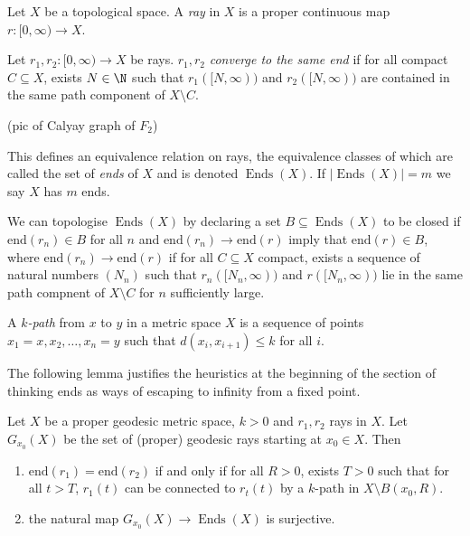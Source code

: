 \documentclass[a4paper]{article}
\DeclareMathOperator{\Ends}{Ends} %
\begin{document}
\begin{definition}[ray]
  Let \(X\) be a topological space. A \emph{ray} in \(X\) is a proper continuous map \(r: [0, \infty) \to X\).
\end{definition}

\begin{definition}
  Let \(r_1, r_2: [0, \infty) \to X\) be rays. \(r_1, r_2\) \emph{converge to the same end} if for all compact \(C \subseteq X\), exists \(N \in \N\) such that \(r_1([N, \infty))\) and \(r_2([N, \infty))\) are contained in the same path component of \(X \setminus C\).
\end{definition}

(pic of Calyay graph of \(F_2\))

This defines an equivalence relation on rays, the equivalence classes of which are called the set of \emph{ends} of \(X\) and is denoted \(\Ends(X)\). If \(|\Ends(X)| = m\) we say \(X\) has \(m\) ends.

We can topologise \(\Ends(X)\) by declaring a set \(B \subseteq \Ends(X)\) to be closed if \(\mathrm{end}(r_n) \in B\) for all \(n\) and \(\mathrm{end}(r_n) \to \mathrm{end}(r)\) imply that \(\mathrm{end}(r) \in B\), where \(\mathrm{end}(r_n) \to \mathrm{end}(r)\) if for all \(C \subseteq X\) compact, exists a sequence of natural numbers \((N_n)\) such that \(r_n([N_n, \infty))\) and \(r([N_n, \infty))\) lie in the same path compnent of \(X \setminus C\) for \(n\) sufficiently large.

\begin{definition}
  A \emph{\(k\)-path} from \(x\) to \(y\) in a metric space \(X\) is a sequence of points \(x_1 = x, x_2, \dots, x_n = y\) such that \(d(x_i, x_{i + 1}) \leq k\) for all \(i\).
\end{definition}

The following lemma justifies the heuristics at the beginning of the section of thinking ends as ways of escaping to infinity from a fixed point.

\begin{lemma}
  Let \(X\) be a proper geodesic metric space, \(k > 0\) and \(r_1, r_2\) rays in \(X\). Let \(G_{x_0}(X)\) be the set of (proper) geodesic rays starting at \(x_0 \in X\). Then
  \begin{enumerate}
  \item \(\mathrm{end}(r_1) = \mathrm{end}(r_2)\) if and only if for all \(R > 0\), exists \(T > 0\) such that for all \(t > T\), \(r_1(t)\) can be connected to \(r_t(t)\) by a \(k\)-path in \(X \setminus B(x_0, R)\).
  \item the natural map \(G_{x_0}(X) \to \Ends(X)\) is surjective.
  \end{enumerate}
\end{lemma}
\end{document}
